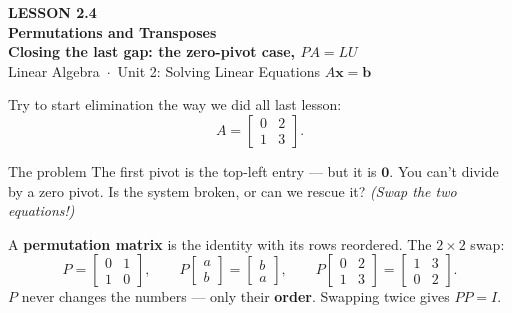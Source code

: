 \documentclass[aspectratio=169, 11pt]{beamer}
\newcommand{\xx}{\mathbf{x}}
\newcommand{\bb}{\mathbf{b}}
\newcommand{\PP}{P}
\begin{document}
{
\begin{frame}[plain]
  \vspace{2.8cm}\hspace{0.55cm}%
  \begin{minipage}{0.9\textwidth}
    {\color{goldacc}\bfseries\small LESSON 2.4}\\[0.5cm]
    {\color{white}\bfseries\LARGE Permutations and Transposes}\\[0.3cm]
    {\color{white}\bfseries\large Closing the last gap: the zero-pivot case, $\PP A=LU$}\\[1.0cm]
    {\color{blushmid}\small Linear Algebra~$\cdot$~Unit 2: Solving Linear Equations $A\xx=\bb$}
  \end{minipage}
\end{frame}
}

\begin{frame}[t, plain]
  Try to start elimination the way we did all last lesson:
  \[
    A = \begin{bmatrix} 0 & 2 \\ 1 & 3 \end{bmatrix}.
  \]
  \begin{block}{The problem}
    The first pivot is the top-left entry --- but it is $\mathbf{0}$. You can't divide by a zero pivot.
    Is the system broken, or can we rescue it? \emph{(Swap the two equations!)}
  \end{block}
\end{frame}

\begin{frame}[t, plain]
  A \textbf{permutation matrix} is the identity with its rows reordered. The $2\times2$ swap:
  \[
    \PP = \begin{bmatrix} 0 & 1 \\ 1 & 0 \end{bmatrix},\qquad
    \PP\begin{bmatrix} a \\ b \end{bmatrix} = \begin{bmatrix} b \\ a \end{bmatrix},\qquad
    \PP\begin{bmatrix} 0 & 2 \\ 1 & 3 \end{bmatrix} = \begin{bmatrix} 1 & 3 \\ 0 & 2 \end{bmatrix}.
  \]
  $\PP$ never changes the numbers --- only their \textbf{order}. Swapping twice gives $\PP\PP=I$.
\end{frame}
\end{document}
